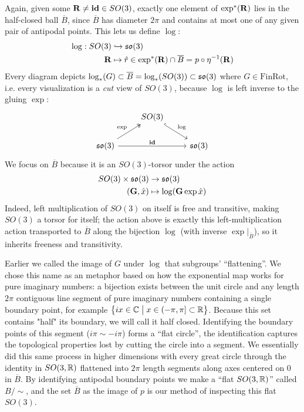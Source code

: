 \documentclass{amsart}
\theoremstyle{plain}
\theoremstyle{definition}
\begin{document}
    Again, given some $\mathbf{R}\neq\mathbf{id} \in SO(3)$, exactly one element of $\exp^*(\mathbf{R})$ lies in the half-closed ball $\overline{B}$, since $\overline{B}$ has diameter $2\pi$ and contains at most one of any given pair of antipodal points. This lets us define $\log$:
    \begin{align}
        \log: SO(3)&\hookrightarrow \mathfrak{so}(3) \\
        \mathbf{R}&\mapsto \hat{r}\in\exp^*(\mathbf{R})\cap \overline{B} = p\circ \eta^{-1}(\mathbf{R})
    \end{align}
    Every diagram depicts $\log_*(G)\subset\overline{B}=\log_*(SO(3))\subset\mathfrak{so}(3)$ where $G\in \mathrm{FinRot}$, i.e. every visualization is a \emph{cut} view of $SO(3)$, because $\log$ is left inverse to the gluing $\exp$:
    \begin{equation}
        \begin{tikzcd}
           & SO(3)\arrow[dr, hook, "\log"] & \\
           \so(3) \arrow[ur, two heads, "\exp"]\arrow[rr, "\id"]&& \so(3)
        \end{tikzcd}
    \end{equation}
    We focus on $\overline{B}$ because it is an $SO(3)$-torsor under the action
    \begin{align}
        SO(3)\times \mathfrak{so}(3)&\to \mathfrak{so}(3)\\
        (\mathbf{G},\hat{x})&\mapsto \log(\mathbf{G}\exp{\hat{x}})\nonumber
    \end{align}
    Indeed, left multiplication of $SO(3)$ on itself is free and transitive, making $SO(3)$ a torsor for itself; the action above is exactly this left-multiplication action transported to $\overline{B}$ along the bijection $\log$ (with inverse $\exp|_{\overline{B}}$), so it inherits freeness and transitivity.
    
    Earlier we called the image of $G$ under $\log$ that subgroups' ``flattening''. We chose this name as an metaphor based on how the exponential map works for pure imaginary numbers: a bijection exists between the unit circle and any length $2\pi$ contiguous line segment of pure imaginary numbers containing a single boundary point, for example $\left\{ix\in\mathbb{C} \hspace{1mm}\big|\hspace{1mm} x\in(-\pi,\pi]\subset\mathbb{R}\right\}$. Because this set contains "half" its boundary, we will call it half closed. Identifying the boundary points of this segment ($i\pi\sim -i\pi$) forms a ``flat circle'', the identification captures the topological properties lost by cutting the circle into a segment. We essentially did this same process in higher dimensions with every great circle through the identity in $SO(3,\mathbb{R})$ flattened into $2\pi$ length segments along axes centered on 0 in $\overline{B}$. By identifying antipodal boundary points we make a ``flat $SO(3,\mathbb{R})$'' called $B/\sim$, and the set $\overline{B}$ as the image of $p$ is our method of inspecting this flat $SO(3)$.
    
\end{document}
